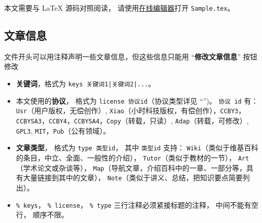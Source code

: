 
\begin{issues}
\issueDraft       %
\issueTODO        %
\issueMissDepend  %
\issueAbstract    %
\issueNeedCite    %
\issueAi          %
\issueAiRaw       %
\end{issues}


本文需要与 LaTeX 源码对照阅读， 请使用\href{https://wuli.wiki/editor}{在线编辑器}打开 \verb`Sample.tex`。

\subsection{文章信息}\label{sub_Sample_1}
文件开头可以用注释声明一些文章信息，但这些信息只能用 “\textbf{修改文章信息}” 按钮修改
\begin{itemize}
\item \textbf{关键词}，格式为 \verb`keys 关键词1|关键词2|...`。
\item 本文使用的\textbf{协议}， 格式为 \verb`license 协议id`（协议类型详见 “”)。 \verb`协议 id` 有： \verb`Usr`（用户版权，无偿创作）, \verb`Xiao`（小时科技版权，有偿创作），\verb`CCBY3`，\verb`CCBYSA3`，\verb`CCBY4`，\verb`CCBYSA4`，\verb`Copy`（转载，只读）, \verb`Adap`（转载，可修改）, \verb`GPL3`, \verb`MIT`，\verb`Pub`（公有领域）。
\item \textbf{文章类型}， 格式为 \verb`type 类型id`， 其中 \verb`类型id` 支持： \verb`Wiki`（类似于维基百科的条目，中立、全面、一般性的介绍）， \verb`Tutor`（类似于教材的一节）， \verb`Art`（学术论文或杂谈等）， \verb`Map`（导航文章，介绍百科中的一章、一部分等，具有大量链接到其中的文章）， \verb`Note`（类似于讲义、总结，把知识要点简要列出）。
\item \verb`% keys`， \verb`% license`， \verb`% type` 三行注释必须紧接标题的注释， 中间不能有空行， 顺序不限。
\end{itemize}

